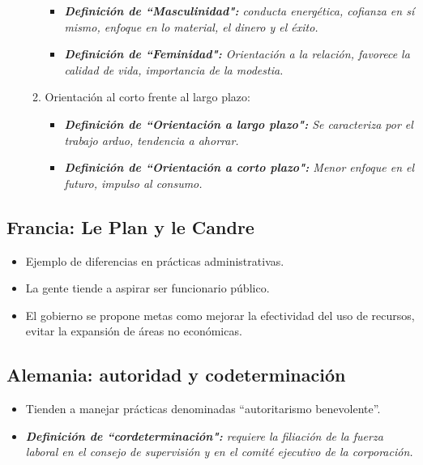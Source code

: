 \documentclass{article}
\begin{document}
\begin{itemize}
\begin{enumerate}
\begin{itemize}
                    \item \emph{\textbf{Definición de ``Masculinidad":} conducta energética, cofianza en sí mismo, enfoque en lo material, el dinero y el éxito.}
                    \item \emph{\textbf{Definición de ``Feminidad":} Orientación a la relación, favorece la calidad de vida, importancia de la modestia.}
                \end{itemize}
            \item Orientación al corto frente al largo plazo:
                \begin{itemize}
                    \item \emph{\textbf{Definición de ``Orientación a largo plazo":} Se caracteriza por el trabajo arduo, tendencia a ahorrar.}
                    \item \emph{\textbf{Definición de ``Orientación a corto plazo":} Menor enfoque en el futuro, impulso al consumo.}
                \end{itemize}
        \end{enumerate}
\end{itemize}

\subsection{Francia: Le Plan y le Candre}
\begin{itemize}
    \item Ejemplo de diferencias en prácticas administrativas.
    \item La gente tiende a aspirar ser funcionario público.
    \item El gobierno se propone metas como mejorar la efectividad del uso de recursos, evitar la expansión de áreas no económicas.
\end{itemize}

\subsection{Alemania: autoridad y codeterminación}
\begin{itemize}
    \item Tienden a manejar prácticas denominadas ``autoritarismo benevolente''.
    \item \emph{\textbf{Definición de ``cordeterminación":} requiere la filiación de la fuerza laboral en el consejo de supervisión y en el comité ejecutivo de la corporación.}
\end{itemize}
\end{document}
